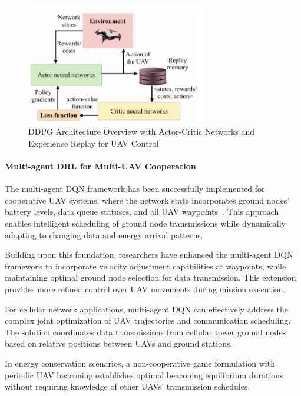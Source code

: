 \begin{figure}[ht]
\centering
\includegraphics[width=0.7\textwidth]{Figures/Chapter2/Section1/4.png}
\caption{DDPG Architecture Overview with Actor-Critic Networks and Experience Replay for UAV Control \cite{kurunathan2022machine}}
\label{fig:ddpg_uav_control}
\end{figure}



\paragraph{Multi-agent DRL for Multi-UAV Cooperation}

The multi-agent DQN framework has been successfully implemented for cooperative UAV systems, where the network state incorporates ground nodes' battery levels, data queue statuses, and all UAV waypoints~\cite{dqn_multi_115}. This approach enables intelligent scheduling of ground node transmissions while dynamically adapting to changing data and energy arrival patterns.

Building upon this foundation, researchers have enhanced the multi-agent DQN framework to incorporate velocity adjustment capabilities at waypoints, while maintaining optimal ground node selection for data transmission. This extension provides more refined control over UAV movements during mission execution.

For cellular network applications, multi-agent DQN can effectively address the complex joint optimization of UAV trajectories and communication scheduling. The solution coordinates data transmissions from cellular tower ground nodes based on relative positions between UAVs and ground stations.

In energy conservation scenarios, a non-cooperative game formulation with periodic UAV beaconing establishes optimal beaconing equilibrium durations without requiring knowledge of other UAVs' transmission schedules.

